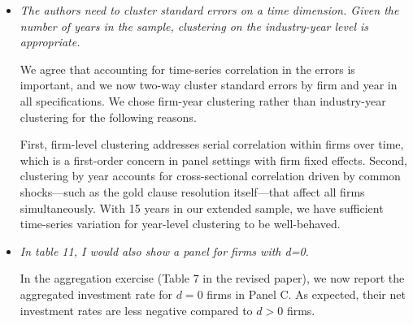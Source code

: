 \begin{itemize}
    \item[\textit{\textcolor{red!60!black}{g.}}] \textit{\textcolor{red!60!black}{
    The authors need to cluster standard errors on a time dimension. Given the number of years in the sample, clustering on the industry-year level is appropriate.
    }}

    \bigskip

    \noindent We agree that accounting for time-series correlation in the errors is important, and we now two-way cluster standard errors by firm and year in all specifications. We chose firm-year clustering rather than industry-year clustering for the following reasons. 
    
    First, firm-level clustering addresses serial correlation within firms over time, which is a first-order concern in panel settings with firm fixed effects. Second, clustering by year accounts for cross-sectional correlation driven by common shocks---such as the gold clause resolution itself---that affect all firms simultaneously. With 15 years in our extended sample, we have sufficient time-series variation for year-level clustering to be well-behaved.

    \item[\textit{\textcolor{red!60!black}{h.}}] \textit{\textcolor{red!60!black}{
    In table 11, I would also show a panel for firms with d=0.
    }}

    \bigskip

    \noindent In the aggregation exercise (Table 7 in the revised paper), we now report the aggregated investment rate for $d = 0$ firms in Panel C. As expected, their net investment rates are less negative compared to $d > 0$ firms. 

\end{itemize}
